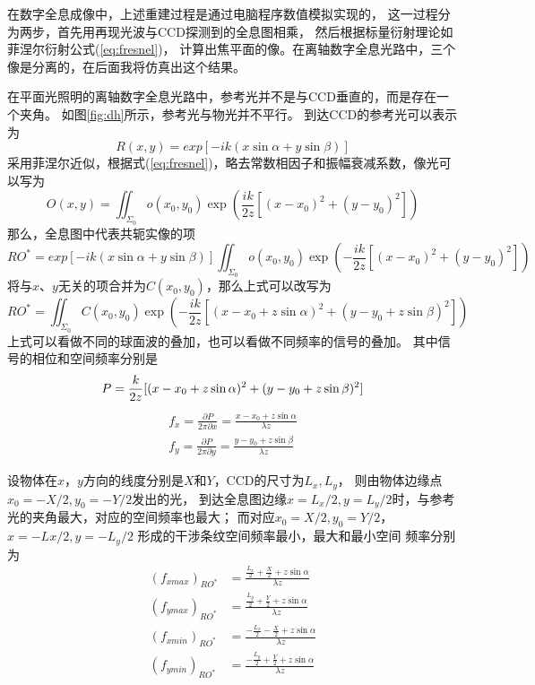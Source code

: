 \documentclass[11pt,a4paper]{article}
\begin{document}
在数字全息成像中，上述重建过程是通过电脑程序数值模拟实现的，
这一过程分为两步，首先用再现光波与CCD探测到的全息图相乘，
然后根据标量衍射理论如菲涅尔衍射公式(\ref{eq:fresnel})，
计算出焦平面的像。在离轴数字全息光路中，三个像是分离的，在后面我将仿真出这个结果。

在平面光照明的离轴数字全息光路中，参考光并不是与CCD垂直的，而是存在一个夹角。
如图\ref{fig:dh}所示，参考光与物光并不平行。
到达CCD的参考光可以表示为
\begin{equation}
R(x,y) = exp[-i k(x \sin \alpha + y \sin \beta)]
\end{equation}
采用菲涅尔近似，根据式(\ref{eq:fresnel})，略去常数相因子和振幅衰减系数，像光可以写为
\begin{equation}
O(x,y) = \iint_{\Sigma_0} o(x_0,y_0) \exp ( \frac{i k}{ 2 z} [(x-x_0)^2+(y-y_0)^2] ) 
\end{equation}
那么，全息图中代表共轭实像的项
\begin{equation}
RO^* = exp[-i k(x \sin \alpha + y \sin \beta)] \iint_{\Sigma_0} o(x_0,y_0) \exp ( -\frac{i k}{ 2 z} [(x-x_0)^2+(y-y_0)^2] ) 
\end{equation}
将与$x$、$y$无关的项合并为$C(x_0,y_0)$，那么上式可以改写为
\begin{equation}
RO^* = \iint_{\Sigma_0} C(x_0,y_0) \exp ( -\frac{i k}{ 2 z} [(x-x_0 + z \sin \alpha)^2+(y-y_0 + z \sin \beta)^2] ) 
\end{equation}
上式可以看做不同的球面波的叠加，也可以看做不同频率的信号的叠加。
其中信号的相位和空间频率分别是
\begin{equation}
P= \frac{k}{ 2 z}[(x-x_0 + z \sin \alpha)^2+(y-y_0 + z \sin \beta)^2] \\
\end{equation}
\begin{equation}
\begin{split}
f_x = \frac{\partial P}{2\pi\partial x} = \frac{x-x_0+z\sin \alpha}{\lambda z} \\
f_y = \frac{\partial P}{2\pi\partial y} = \frac{y-y_0+z\sin \beta}{\lambda z}
\end{split}
\end{equation}

设物体在$x$，$y$方向的线度分别是$X$和$Y$，CCD的尺寸为$L_x, L_y$，
则由物体边缘点$x_0=-X/2, y_0=-Y/2$发出的光，
到达全息图边缘$x=L_x/2, y=L_y/2$时，与参考光的夹角最大，对应的空间频率也最大；
而对应$x_0=X/2,y_0=Y/2$，$x=-Lx/2,y=-L_y/2$
形成的干涉条纹空间频率最小，最大和最小空间
频率分别为
\begin{equation}
\begin{split}
(f_{xmax})_{RO^*} &= \frac{\frac{L_x}{2}+\frac{X}{2}+z\sin\alpha}{\lambda z} \\
(f_{ymax})_{RO^*} &= \frac{\frac{L_y}{2}+\frac{Y}{2}+z\sin\alpha}{\lambda z} \\
(f_{xmin})_{RO^*} &= \frac{-\frac{L_x}{2}-\frac{X}{2}+z\sin\alpha}{\lambda z} \\
(f_{ymin})_{RO^*} &= \frac{-\frac{L_y}{2}+\frac{Y}{2}+z\sin\alpha}{\lambda z}
\end{split}
\label{eq:fmax}
\end{equation}
\end{document}
